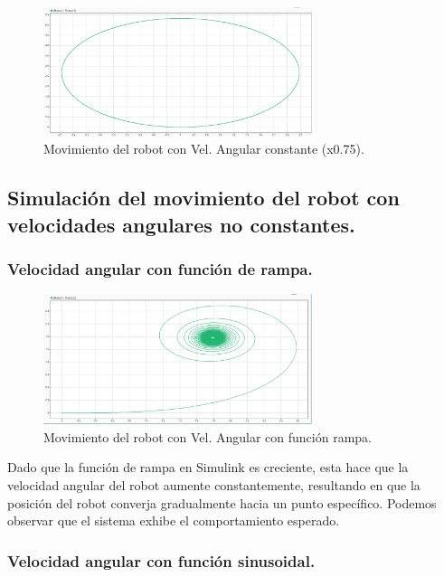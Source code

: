 \documentclass[a4paper, 12pt]{article}
\begin{document}
    \begin{figure}[htp!]
	\centering
		\includegraphics[width=0.7\textwidth]{figures/Movimiento_vcelocidad_constante.png}
		\caption{Movimiento del robot con Vel. Angular constante (x0.75).}
	\end{figure}

    \newpage
    \subsection{Simulación del movimiento del robot con velocidades angulares no constantes.}
        
    \subsubsection{Velocidad angular con función de rampa.}

    \begin{figure}[htp!]
	\centering
		\includegraphics[width=0.7\textwidth]{figures/Movimiento_robot_rampa.png}
		\caption{Movimiento del robot con Vel. Angular con función rampa.}
	\end{figure}

    Dado que la función de rampa en Simulink es creciente, esta hace que la velocidad angular del robot aumente constantemente, resultando en que la posición del robot converja gradualmente hacia un punto específico. Podemos observar que el sistema exhibe el comportamiento esperado.

    \subsubsection{Velocidad angular con función sinusoidal.}
\end{document}
